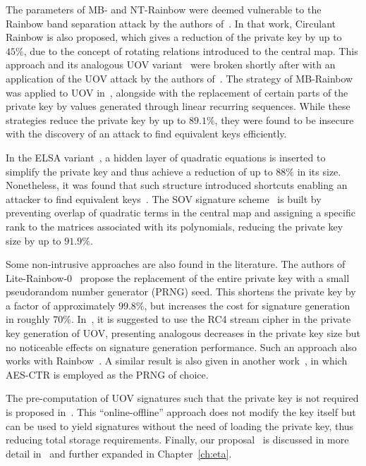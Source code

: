 \documentclass[12pt, a4paper, oneside]{memoir}
\theoremstyle{definition}
\begin{document}
The parameters of MB- and NT-Rainbow were deemed vulnerable to the Rainbow band separation attack by the authors of~\cite{Peng:201706}. In that work, Circulant Rainbow is also proposed, which gives a reduction of the private key by up to $45\%$, due to the concept of rotating relations introduced to the central map. This approach and its analogous UOV variant~\cite{Peng:201803} were broken shortly after with an application of the UOV attack by the authors of~\cite{Hashimoto:201903}. The strategy of MB-Rainbow was applied to UOV in~\cite{Tan:201511}, alongside with the replacement of certain parts of the private key by values generated through linear recurring sequences. While these strategies reduce the private key by up to $89.1\%$, they were found to be insecure~\cite{Park:201803} with the discovery of an attack to find equivalent keys efficiently. 

In the ELSA variant~\cite{Shim:201712}, a hidden layer of quadratic equations is inserted to simplify the private key and thus achieve a reduction of up to $88\%$ in its size. Nonetheless, it was found that such structure introduced shortcuts enabling an attacker to find equivalent keys~\cite{Hashimoto:201909}. The SOV signature scheme~\cite{Shim:202001} is built by preventing overlap of quadratic terms in the central map and assigning a specific rank to the matrices associated with its polynomials, reducing the private key size by up to $91.9\%$.

Some non-intrusive approaches are also found in the literature. The authors of Lite-Rainbow-0~\cite{Shim:201512} propose the replacement of the entire private key with a small pseudorandom number generator (PRNG) seed. This shortens the private key by a factor of approximately $99.8\%$, but increases the cost for signature generation in roughly $70\%$. In~\cite{Borges:201209}, it is suggested to use the RC4 stream cipher in the private key generation of UOV, presenting analogous decreases in the private key size but no noticeable effects on signature generation performance. Such an approach also works with Rainbow~\cite{Dornelles:201910}. A similar result is also given in another work~\cite{Seo:201403}, in which AES-CTR is employed as the PRNG of choice.

The pre-computation of UOV signatures such that the private key is not required is proposed in~\cite{Chen:201603}. This ``online-offline'' approach does not modify the key itself but can be used to yield signatures without the need of loading the private key, thus reducing total storage requirements. Finally, our proposal~\cite{Zambonin:201907} is discussed in more detail in~\cite{Bittencourt:201911} and further expanded in Chapter~\ref{ch:eta}.
\end{document}
